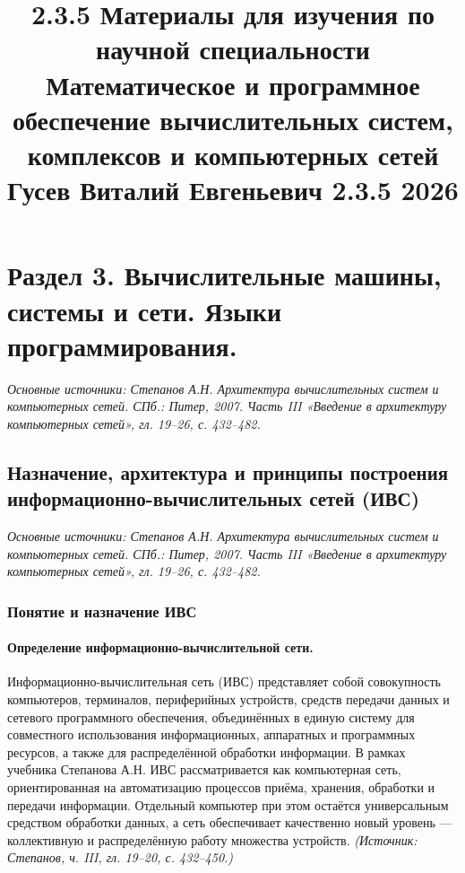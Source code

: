 \documentclass[a4paper,12pt]{article}
\title{2.3.5 Материалы для изучения по научной специальности \\
Математическое и программное обеспечение вычислительных систем, комплексов и компьютерных сетей \\
Гусев Виталий Евгеньевич 2.3.5 2026}
\date{}
\begin{document}
\maketitle

\tableofcontents
\newpage

\setcounter{section}{2} %
\section{Раздел 3. Вычислительные машины, системы и сети. Языки программирования.}

\noindent\textit{Основные источники: Степанов А.Н. Архитектура вычислительных систем и компьютерных сетей. СПб.: Питер, 2007. Часть III «Введение в архитектуру компьютерных сетей», гл. 19–26, с. 432–482.}

\subsection{Назначение, архитектура и принципы построения информационно-вычислительных сетей (ИВС)}

\noindent\textit{Основные источники: Степанов А.Н. Архитектура вычислительных систем и компьютерных сетей. СПб.: Питер, 2007. Часть III «Введение в архитектуру компьютерных сетей», гл. 19–26, с. 432–482.}

\subsubsection{Понятие и назначение ИВС}

\paragraph{Определение информационно-вычислительной сети.}
Информационно-вычислительная сеть (ИВС) представляет собой совокупность компьютеров, терминалов, периферийных устройств, средств передачи данных и сетевого программного обеспечения, объединённых в единую систему для совместного использования информационных, аппаратных и программных ресурсов, а также для распределённой обработки информации. В рамках учебника Степанова А.Н. ИВС рассматривается как компьютерная сеть, ориентированная на автоматизацию процессов приёма, хранения, обработки и передачи информации. Отдельный компьютер при этом остаётся универсальным средством обработки данных, а сеть обеспечивает качественно новый уровень — коллективную и распределённую работу множества устройств.
\textit{(Источник: Степанов, ч. III, гл. 19–20, с. 432–450.)}
\end{document}
